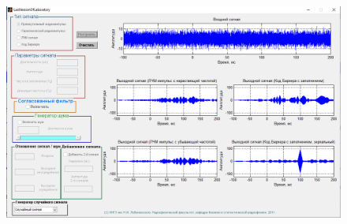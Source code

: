 \begin{figure}[H]
    \centering
    \includegraphics[width=\linewidth]{imgs/task6/barker_mirror}
    \caption{}
    \label{fig:6.4}
\end{figure}
